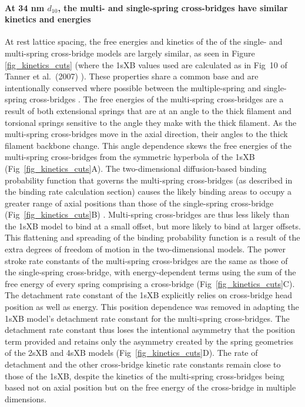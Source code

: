 \documentclass[10pt]{article}
\newcommand{\citep}[1]{\cite{#1}} %
\begin{document}
\paragraph{At 34 nm $d_{10}$, the multi- and single-spring cross-bridges have similar kinetics and energies} %
At rest lattice spacing, the free energies and kinetics of the of the single- and multi-spring cross-bridge models are largely similar, as seen in Figure \ref{fig_kinetics_cuts} (where the 1sXB values used are calculated as in Fig~10 of Tanner et al.~(2007) \citep{Tanner2007}).  
These properties share a common base and are intentionally conserved where possible between the multiple-spring and single-spring cross-bridges \citep{Pate1989}.
The free energies of the multi-spring cross-bridges are a result of both extensional springs that are at an angle to the thick filament and torsional springs sensitive to the angle they make with the thick filament. 
As the multi-spring cross-bridges move in the axial direction, their angles to the thick filament backbone change. 
This angle dependence skews the free energies of the multi-spring cross-bridges from the symmetric hyperbola of the 1sXB (Fig~\ref{fig_kinetics_cuts}A).
The two-dimensional diffusion-based binding probability function that governs the multi-spring cross-bridges (as described in the binding rate calculation section) causes the likely binding areas to occupy a greater range of axial positions than those of the single-spring cross-bridge (Fig~\ref{fig_kinetics_cuts}B) \citep{BergBook, DillBook}.
Multi-spring cross-bridges are thus less likely than the 1sXB model to bind at a small offset, but more likely to bind at larger offsets. 
This flattening and spreading of the binding probability function is a result of the extra degrees of freedom of motion in the two-dimensional models. 
The power stroke rate constants of the multi-spring cross-bridges are the same as those of the single-spring cross-bridge, with energy-dependent terms using the sum of the free energy of every spring comprising a cross-bridge (Fig~\ref{fig_kinetics_cuts}C). 
The detachment rate constant of the 1sXB explicitly relies on cross-bridge head position as well as energy.
This position dependence was removed in adapting the 1sXB model's detachment rate constant for the multi-spring cross-bridges. 
The detachment rate constant thus loses the intentional asymmetry that the position term provided and retains only the asymmetry created by the spring geometries of the 2sXB and 4sXB models (Fig~\ref{fig_kinetics_cuts}D). 
The rate of detachment and the other cross-bridge kinetic rate constants remain close to those of the 1sXB, despite the kinetics of the multi-spring cross-bridges being based not on axial position but on the free energy of the cross-bridge in multiple dimensions. 
\end{document}
